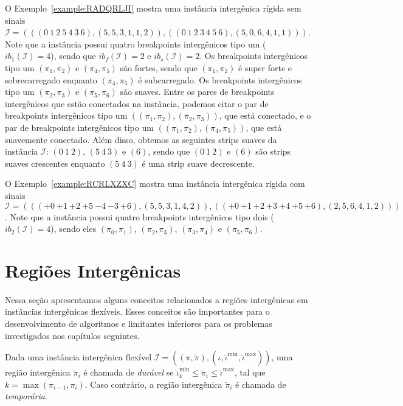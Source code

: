 O Exemplo~\ref{example:RADQRLJI} mostra uma instância intergênica rígida sem sinais $\mathcal{I} = (((0~1~2~5~4~3\allowbreak~6),\allowbreak(5,5,3,1,1,2)),\allowbreak((0~1~2~3~4~5~6),\allowbreak(5,0,6,4,1,1)))$. Note que a instância possui quatro breakpoints intergênicos tipo um ($ib_{1}(\mathcal{I}) = 4$), sendo que $ib_f(\mathcal{I}) = 2$ e $ib_s(\mathcal{I}) = 2$. Os breakpoints intergênicos tipo um $(\pi_1,\pi_2)$ e $(\pi_4,\pi_5)$ são fortes, sendo que $(\pi_1,\pi_2)$ é super forte e sobrecarregado enquanto $(\pi_4,\pi_5)$ é subcarregado. Os breakpoints intergênicos tipo um $(\pi_2,\pi_3)$ e $(\pi_5,\pi_6)$ são suaves. Entre os pares de breakpoints intergênicos que estão conectados na instância, podemos citar o par de breakpoints intergênicos tipo um $((\pi_1,\pi_2),(\pi_2,\pi_3))$, que está conectado, e o par de breakpoints intergênicos tipo um $((\pi_1,\pi_2),(\pi_4,\pi_5))$, que está suavemente conectado. Além disso, obtemos as seguintes strips suaves da instância $\mathcal{I}$: $(0~1~2)$, $(5~4~3)$ e $(6)$, sendo que $(0~1~2)$ e $(6)$ são strips suaves crescentes enquanto $(5~4~3)$ é uma strip suave decrescente.



O Exemplo~\ref{example:RCRLXZXC} mostra uma instância intergênica rígida com sinais $\mathcal{I} = \allowbreak((({+0}~{+1}~{+2}~\allowbreak{+5}~{-4}~{-3}~{+6}),\allowbreak(5,5,3,1,4,2)),\allowbreak(({+0}~{+1}~{+2}~{+3}~{+4}~{+5}~{+6}),\allowbreak(2,5,6,4,1,2)))$. Note que a instância possui quatro breakpoints intergênicos tipo dois ($ib_{2}(\mathcal{I}) = 4$), sendo eles $(\pi_0,\pi_1)$, $(\pi_2,\pi_3)$, $(\pi_3,\pi_4)$ e $(\pi_5,\pi_6)$.



\section{Regiões Intergênicas}

Nessa seção apresentamos alguns conceitos relacionados a regiões intergênicas em instâncias intergênicas flexíveis. Esses conceitos são importantes para o desenvolvimento de algoritmos e limitantes inferiores para os problemas investigados nos capítulos seguintes.

\begin{definition}
  Dada uma instância intergênica flexível $\mathcal{I} = ((\pi,\breve\pi),(\iota,\breve\iota^{\min},\breve\iota^{\max}))$, uma região intergênica $\breve\pi_i$ é chamada de \emph{durável} se $\breve\iota^{\min}_k \le \breve\pi_i \le \breve\iota^{\max}$, tal que $k = \max(\pi_{i-1}, \pi_i)$. Caso contrário, a região intergênica $\breve\pi_i$ é chamada de \emph{temporária}. 
\end{definition}

